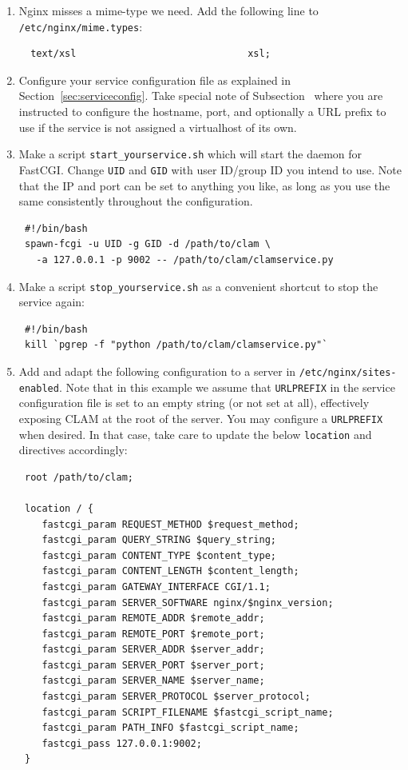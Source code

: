 \documentclass[a4paper,12pt]{report}
\begin{document}
\begin{enumerate} \item Nginx misses a mime-type we need. Add the following
    line to \texttt{/etc/nginx/mime.types}:
\begin{verbatim}
  text/xsl                              xsl;
\end{verbatim}

\item Configure your service configuration file as explained in Section~\ref{sec:serviceconfig}. Take special note of Subsection~\label{sec:sadmin} where you are instructed to configure the hostname, port, and optionally a URL prefix to use if the service is not assigned a virtualhost of its own.

\item Make a script \texttt{start\_yourservice.sh} which will start the daemon for FastCGI. Change \texttt{UID} and \texttt{GID} with user ID/group ID you intend to use. Note that the IP and port can be set to anything you like, as long as you use the same consistently throughout the configuration.
\begin{verbatim}
 #!/bin/bash
 spawn-fcgi -u UID -g GID -d /path/to/clam \
   -a 127.0.0.1 -p 9002 -- /path/to/clam/clamservice.py
\end{verbatim}

\item Make a script \texttt{stop\_yourservice.sh} as a convenient shortcut to stop the service again:
\begin{verbatim}
 #!/bin/bash
 kill `pgrep -f "python /path/to/clam/clamservice.py"`
\end{verbatim}

\item Add and adapt the following configuration to a server in \texttt{/etc/nginx/sites-enabled}. Note that in this example we assume that \texttt{URLPREFIX} in the service configuration file is set to an empty string (or not set at all), effectively exposing CLAM at the root of the server. You may configure a \texttt{URLPREFIX} when desired. In that case, take care to update the below \texttt{location} and directives accordingly:
\begin{verbatim}
 root /path/to/clam;

 location / {
    fastcgi_param REQUEST_METHOD $request_method;
    fastcgi_param QUERY_STRING $query_string;
    fastcgi_param CONTENT_TYPE $content_type;
    fastcgi_param CONTENT_LENGTH $content_length;
    fastcgi_param GATEWAY_INTERFACE CGI/1.1;
    fastcgi_param SERVER_SOFTWARE nginx/$nginx_version;
    fastcgi_param REMOTE_ADDR $remote_addr;
    fastcgi_param REMOTE_PORT $remote_port;
    fastcgi_param SERVER_ADDR $server_addr;
    fastcgi_param SERVER_PORT $server_port;
    fastcgi_param SERVER_NAME $server_name;
    fastcgi_param SERVER_PROTOCOL $server_protocol;
    fastcgi_param SCRIPT_FILENAME $fastcgi_script_name;
    fastcgi_param PATH_INFO $fastcgi_script_name;
    fastcgi_pass 127.0.0.1:9002;
 }


\end{verbatim}
\end{enumerate}
\end{document}
